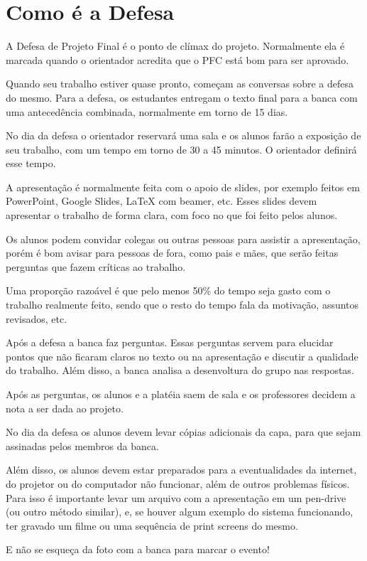 
\chapter{Como é a Defesa}

A Defesa de Projeto Final é o ponto de clímax do projeto. Normalmente ela é marcada quando o orientador acredita que o PFC está bom para ser aprovado.

Quando seu trabalho estiver quase pronto, começam as conversas sobre a defesa do mesmo. Para a defesa, os estudantes entregam o texto final para a banca com uma antecedência combinada, normalmente em torno de 15 dias.

No dia da defesa o orientador reservará uma sala e os alunos farão a exposição de seu trabalho, com um tempo em torno de 30 a 45 minutos. O orientador definirá esse tempo.

A apresentação é normalmente feita com o apoio de slides, por exemplo feitos em PowerPoint, Google Slides, LaTeX com beamer, etc. Esses slides devem apresentar o trabalho de forma clara, com foco no que foi feito pelos alunos.

Os alunos podem convidar colegas ou outras pessoas para assistir a apresentação, porém é bom avisar para pessoas de fora, como pais e mães, que serão feitas perguntas que fazem críticas ao trabalho.

Uma proporção razoável é que pelo menos 50\% do tempo seja gasto com o trabalho realmente feito, sendo que o resto do tempo fala da motivação, assuntos revisados, etc.

Após a defesa a banca faz perguntas. Essas perguntas servem para elucidar pontos que não ficaram claros no texto ou na apresentação e discutir a qualidade do trabalho. Além disso, a banca analisa a desenvoltura do grupo nas respostas.

Após as perguntas, os alunos e a platéia saem de sala e os professores decidem a nota a ser dada ao projeto.

No dia da defesa os alunos devem levar cópias adicionais da capa, para que sejam assinadas pelos membros da banca.

Além disso, os alunos devem estar preparados para a eventualidades da internet, do projetor ou do computador não funcionar, além de outros problemas físicos. Para isso é importante levar um arquivo com a apresentação em um pen-drive (ou outro método similar), e, se houver algum exemplo do sistema funcionando, ter gravado um filme ou uma sequência de print screens do mesmo.

E não se esqueça da foto com a banca para marcar o evento!